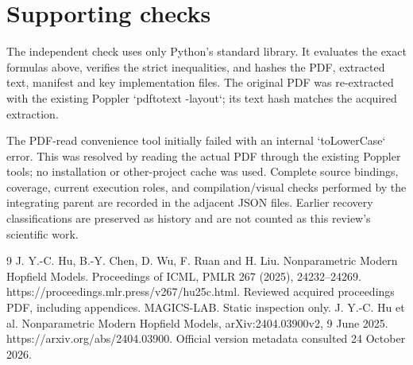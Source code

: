 \documentclass[10pt]{article}
\begin{document}
\section*{Supporting checks}
The independent check uses only Python’s standard library. It evaluates the exact formulas above, verifies the strict inequalities, and hashes the PDF, extracted text, manifest and key implementation files. The original PDF was re-extracted with the existing Poppler `pdftotext -layout`; its text hash matches the acquired extraction.\par
The PDF-read convenience tool initially failed with an internal `toLowerCase` error. This was resolved by reading the actual PDF through the existing Poppler tools; no installation or other-project cache was used. Complete source bindings, coverage, current execution roles, and compilation/visual checks performed by the integrating parent are recorded in the adjacent JSON files. Earlier recovery classifications are preserved as history and are not counted as this review’s scientific work.\par
9 J. Y.-C. Hu, B.-Y. Chen, D. Wu, F. Ruan and H. Liu. Nonparametric Modern Hopfield Models. Proceedings of ICML, PMLR 267 (2025), 24232–24269. https://proceedings.mlr.press/v267/hu25c.html. Reviewed acquired proceedings PDF, including appendices. MAGICS-LAB. Static inspection only. J. Y.-C. Hu et al. Nonparametric Modern Hopfield Models, arXiv:2404.03900v2, 9 June 2025. https://arxiv.org/abs/2404.03900. Official version metadata consulted 24 October 2026.\par
\end{document}

